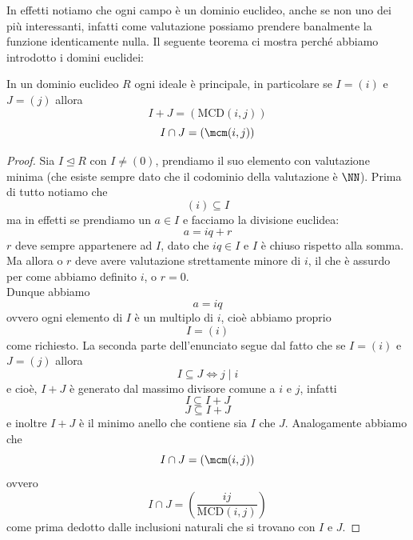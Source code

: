 \documentclass[11pt]{scrartcl}
\newcommand{\MCD}{\text{MCD}}
\newcommand{\normal}{\mathrel{\unlhd}}
\begin{document}
	In effetti notiamo che ogni campo è un dominio euclideo, anche se non uno dei più interessanti, infatti come valutazione possiamo prendere banalmente la funzione identicamente nulla. Il seguente teorema ci mostra perché abbiamo introdotto i domini euclidei:
	\begin{theorem}
		In un dominio euclideo $R$ ogni ideale è principale, in particolare se $I=(i)$ e $J=(j)$ allora
		$$I+J=(\MCD(i,j))$$
		$$I\cap J = \left(\mcm(i,j)\right)$$
	\end{theorem}
	\begin{proof}
		Sia $I\normal R$ con $I\ne (0)$, prendiamo il suo elemento con valutazione minima (che esiste sempre dato che il codominio della valutazione è $\NN$). Prima di tutto notiamo che 
		$$(i)\subseteq I$$
		ma in effetti se prendiamo un $a\in I$ e facciamo la divisione euclidea:
		$$a=iq+r$$
		$r$ deve sempre appartenere ad $I$, dato che $iq\in I$ e $I$ è chiuso rispetto alla somma. Ma allora o $r$ deve avere valutazione strettamente minore di $i$, il che è assurdo per come abbiamo definito $i$, o $r=0$. \\
		Dunque abbiamo
		$$a=iq$$
		ovvero ogni elemento di $I$ è un multiplo di $i$, cioè abbiamo proprio 
		$$I=(i)$$
		come richiesto. La seconda parte dell'enunciato segue dal fatto che se $I=(i)$ e $J=(j)$ allora 
		$$I\subseteq J \iff j\mid i$$
		e cioè, $I+J$ è generato dal massimo divisore comune a $i$ e $j$, infatti 
		$$I\subseteq I+J$$
		$$J\subseteq I+J$$
		e inoltre $I+J$ è il minimo anello che contiene sia $I$ che $J$. Analogamente abbiamo che 
		$$I\cap J=(\mcm(i,j))$$
		ovvero 
		$$I\cap J=\left(\frac{ij}{\MCD(i,j)}\right)$$
		come prima dedotto dalle inclusioni naturali che si trovano con $I$ e $J$.
	\end{proof}
\end{document}
